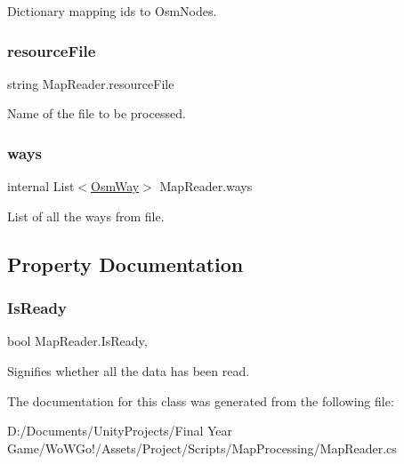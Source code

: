 Dictionary mapping ids to Osm\+Nodes. 

\mbox{\label{class_map_reader_aff566165f4af74a7e11ea3df1aa4a78e}} 
\subsubsection{\texorpdfstring{resourceFile}{resourceFile}}
{\footnotesize\ttfamily string Map\+Reader.\+resource\+File}



Name of the file to be processed. 

\mbox{\label{class_map_reader_a785edd952542f996b0897dc8b4bde67b}} 
\subsubsection{\texorpdfstring{ways}{ways}}
{\footnotesize\ttfamily internal List$<$\mbox{\hyperlink{class_osm_way}{Osm\+Way}}$>$ Map\+Reader.\+ways\hspace{0.3cm}{\ttfamily [private]}}



List of all the ways from file. 



\subsection{Property Documentation}
\mbox{\label{class_map_reader_a32d4f6e5c247548b2780e4103a389ed7}} 
\subsubsection{\texorpdfstring{IsReady}{IsReady}}
{\footnotesize\ttfamily bool Map\+Reader.\+Is\+Ready\hspace{0.3cm}{\ttfamily [get]}, {}}



Signifies whether all the data has been read. 



The documentation for this class was generated from the following file\+:\begin{DoxyCompactItemize}
\item 
D\+:/\+Documents/\+Unity\+Projects/\+Final Year Game/\+Wo\+W\+Go!/\+Assets/\+Project/\+Scripts/\+Map\+Processing/Map\+Reader.\+cs\end{DoxyCompactItemize}
